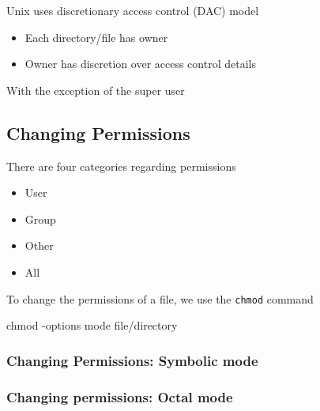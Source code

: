 \documentclass{report}
\begin{document}
    \pagebreak 
    \bigbreak \noindent 
    Unix uses discretionary access control (DAC) model
    \begin{itemize}
        \item Each directory/file has owner
        \item Owner has discretion over access control details
    \end{itemize}
    With the exception of the super user

    \bigbreak \noindent 
    \subsection{Changing Permissions}
    \bigbreak \noindent 
    There are four categories regarding permissions 
    \begin{itemize}
        \item User 
        \item Group
        \item Other
        \item All
    \end{itemize}
    \bigbreak \noindent 
    To change the permissions of a file, we use the \texttt{chmod} command
    \bigbreak \noindent 
    \begin{bashcode}
    chmod -options mode file/directory
    \end{bashcode}
    \bigbreak \noindent 
    \subsubsection{Changing Permissions: Symbolic mode}
    \bigbreak \noindent 
    \begin{minipage}[]{0.47\textwidth}
    \end{minipage}
    \hspace{.1in}
    \begin{minipage}[]{0.47\textwidth}
    \end{minipage}

    

    \pagebreak 
    \subsubsection{Changing permissions: Octal mode}

    \bigbreak \noindent 
\end{document}
